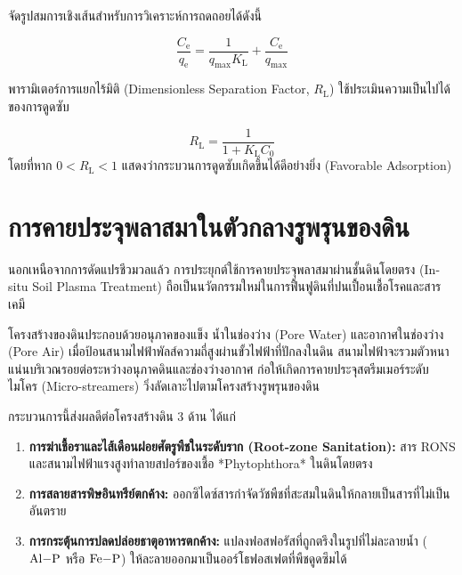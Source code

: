 จัดรูปสมการเชิงเส้นสำหรับการวิเคราะห์การถดถอยได้ดังนี้

\begin{equation}
    \frac{C_{\text{e}}}{q_{\text{e}}} = \frac{1}{q_{\text{max}} K_{\text{L}}} + \frac{C_{\text{e}}}{q_{\text{max}}}
    \label{eq:langmuir_linear}
\end{equation}

พารามิเตอร์การแยกไร้มิติ (Dimensionless Separation Factor, $R_{\text{L}}$) ใช้ประเมินความเป็นไปได้ของการดูดซับ

\begin{equation}
    R_{\text{L}} = \frac{1}{1 + K_{\text{L}} C_0}
    \label{eq:rl_factor}
\end{equation}
โดยที่หาก $0 < R_{\text{L}} < 1$ แสดงว่ากระบวนการดูดซับเกิดขึ้นได้ดีอย่างยิ่ง (Favorable Adsorption)

\section{การคายประจุพลาสมาในตัวกลางรูพรุนของดิน}

นอกเหนือจากการดัดแปรชีวมวลแล้ว การประยุกต์ใช้การคายประจุพลาสมาผ่านชั้นดินโดยตรง (In-situ Soil Plasma Treatment) ถือเป็นนวัตกรรมใหม่ในการฟื้นฟูดินที่ปนเปื้อนเชื้อโรคและสารเคมี

โครงสร้างของดินประกอบด้วยอนุภาคของแข็ง น้ำในช่องว่าง (Pore Water) และอากาศในช่องว่าง (Pore Air) เมื่อป้อนสนามไฟฟ้าพัลส์ความถี่สูงผ่านขั้วไฟฟ้าที่ปักลงในดิน สนามไฟฟ้าจะรวมตัวหนาแน่นบริเวณรอยต่อระหว่างอนุภาคดินและช่องว่างอากาศ ก่อให้เกิดการคายประจุสตรีมเมอร์ระดับไมโคร (Micro-streamers) วิ่งลัดเลาะไปตามโครงสร้างรูพรุนของดิน

กระบวนการนี้ส่งผลดีต่อโครงสร้างดิน 3 ด้าน ได้แก่
\begin{enumerate}
    \item \textbf{การฆ่าเชื้อราและไส้เดือนฝอยศัตรูพืชในระดับราก (Root-zone Sanitation):} สาร RONS และสนามไฟฟ้าแรงสูงทำลายสปอร์ของเชื้อ *Phytophthora* ในดินโดยตรง
    \item \textbf{การสลายสารพิษอินทรีย์ตกค้าง:} ออกซิไดซ์สารกำจัดวัชพืชที่สะสมในดินให้กลายเป็นสารที่ไม่เป็นอันตราย
    \item \textbf{การกระตุ้นการปลดปล่อยธาตุอาหารตกค้าง:} แปลงฟอสฟอรัสที่ถูกตรึงในรูปที่ไม่ละลายน้ำ ($\ce{Al-P}$ หรือ $\ce{Fe-P}$) ให้ละลายออกมาเป็นออร์โธฟอสเฟตที่พืชดูดซึมได้
\end{enumerate}


